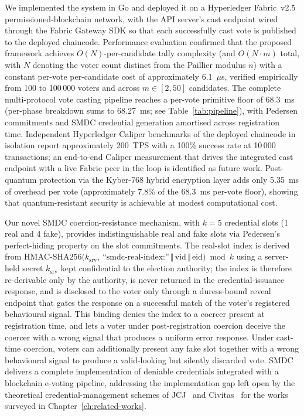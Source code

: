 We implemented the system in Go and deployed it on a Hyperledger Fabric~v2.5~\cite{androulaki2018} permissioned-blockchain network, with the API server's cast endpoint wired through the Fabric Gateway SDK so that each successfully cast vote is published to the deployed chaincode. Performance evaluation confirmed that the proposed framework achieves $O(N)$-per-candidate tally complexity (and $O(N \cdot m)$ total, with $N$ denoting the voter count distinct from the Paillier modulus $n$) with a constant per-vote per-candidate cost of approximately 6.1~$\mu$s, verified empirically from 100 to 100\,000 voters and across $m \in [2, 50]$ candidates. The complete multi-protocol vote casting pipeline reaches a per-vote primitive floor of 68.3~ms (per-phase breakdown sums to 68.27~ms; see Table~\ref{tab:pipeline}), with Pedersen commitments and SMDC credential generation amortised across registration time. Independent Hyperledger Caliper benchmarks of the deployed chaincode in isolation report approximately 200~TPS with a 100\% success rate at 10\,000 transactions; an end-to-end Caliper measurement that drives the integrated cast endpoint with a live Fabric peer in the loop is identified as future work. Post-quantum protection via the Kyber-768 hybrid encryption layer adds only 5.35~ms of overhead per vote (approximately 7.8\% of the 68.3~ms per-vote floor), showing that quantum-resistant security is achievable at modest computational cost.

Our novel SMDC coercion-resistance mechanism, with $k = 5$ credential slots (1 real and 4 fake), provides indistinguishable real and fake slots via Pedersen's perfect-hiding property on the slot commitments. The real-slot index is derived from $\text{HMAC-SHA256}\bigl(k_{\text{srv}},\ \text{``smdc-real-index:''}\,\Vert\,\text{vid}\,\Vert\,\text{eid}\bigr) \bmod k$ using a server-held secret $k_{\text{srv}}$ kept confidential to the election authority; the index is therefore re-derivable only by the authority, is never returned in the credential-issuance response, and is disclosed to the voter only through a duress-bound reveal endpoint that gates the response on a successful match of the voter's registered behavioural signal. This binding denies the index to a coercer present at registration time, and lets a voter under post-registration coercion deceive the coercer with a wrong signal that produces a uniform error response. Under cast-time coercion, voters can additionally present any fake slot together with a wrong behavioural signal to produce a valid-looking but silently discarded vote. SMDC delivers a complete implementation of deniable credentials integrated with a blockchain e-voting pipeline, addressing the implementation gap left open by the theoretical credential-management schemes of JCJ~\cite{jcj2005} and Civitas~\cite{civitas2008} for the works surveyed in Chapter~\ref{ch:related-works}.

